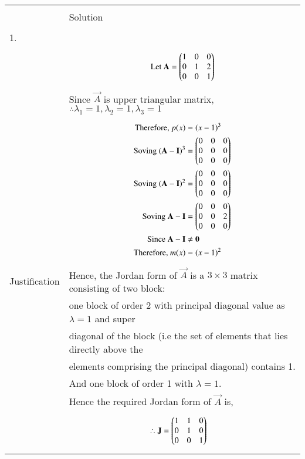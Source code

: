 \begin{longtable}{|l|l|}
\hline
\multirow{3}{*}{} & \\
Statement&Solution\\
\hline
&\\
1.&\\
&\parbox{6cm}{\begin{align*}
    \mbox{Let }\mathbf{A}&=\begin{pmatrix}1&0&0\\0&1&2\\0&0&1\end{pmatrix}\\
\end{align*}}\\
&Since $\vec{A}$ is upper triangular matrix, $\therefore \lambda_{1}=1,\lambda_{2}=1,\lambda_{3}=1$ \\
&\parbox{6cm}{\begin{align*}
    \mbox{Therefore, }p(x)&=(x-1)^3\\
    \mbox{Soving }(\mathbf{A}-\mathbf{I})^3&=\begin{pmatrix}0&0&0\\0&0&0\\0&0&0\end{pmatrix}\\
    \mbox{Soving }(\mathbf{A}-\mathbf{I})^2&=\begin{pmatrix}0&0&0\\0&0&0\\0&0&0\end{pmatrix}\\
    \mbox{Soving }\mathbf{A}-\mathbf{I}&=\begin{pmatrix}0&0&0\\0&0&2\\0&0&0\end{pmatrix}\\
    \mbox{Since }\mathbf{A}-\mathbf{I}&\neq \mathbf{0}\\
    \mbox{Therefore, }m(x)&=(x-1)^2\\
    \end{align*}}\\
Justification&Hence, the Jordan form of $\vec{A}$ is a $3 \times 3$ matrix consisting of two block:\\
&one block of order 2 with principal diagonal value as $\lambda = 1$ and super\\
&diagonal of the block (i.e the set of elements that lies directly above the\\
&elements comprising the principal diagonal) contains 1.\\
&And one block of order 1 with $\lambda=1$.\\
&Hence the required Jordan form of $\vec{A}$ is,\\
&\parbox{6cm}{\begin{align*}
    \therefore \vec{J}&=\myvec{1&1&0\\0&1&0\\0&0&1}

\end{align*}}
\end{longtable}
